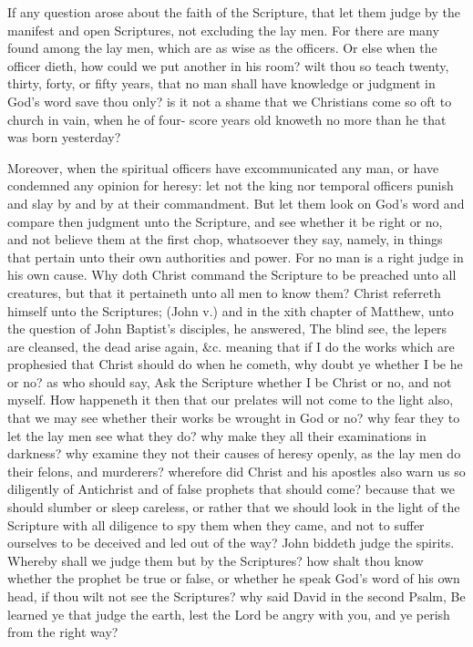 If any question arose about the faith of the Scripture, that 
let them judge by the manifest and open Scriptures, not 
excluding the lay men. For there are many found among 
the lay men, which are as wise as the officers. Or else 
when the officer dieth, how could we put another in his 
room? wilt thou so teach twenty, thirty, forty, or fifty 
years, that no man shall have knowledge or judgment in 
God's word save thou only? is it not a shame that we 
Christians come so oft to church in vain, when he of four- 
score years old knoweth no more than he that was born 
yesterday? 

Moreover, when the spiritual officers have excommunicated
any man, or have condemned any opinion for 
heresy: let not the king nor temporal officers punish and 
slay by and by at their commandment. But let them look 
on God's word and compare then judgment unto the Scripture,
and see whether it be right or no, and not believe 
them at the first chop, whatsoever they say, namely, in 
things that pertain unto their own authorities and power. 
For no man is a right judge in his own cause. Why doth 
Christ command the Scripture to be preached unto all 
creatures, but that it pertaineth unto all men to know 
them? Christ referreth himself unto the Scriptures; (John 
v.) and in the xith chapter of Matthew, unto the question 
of John Baptist's disciples, he answered, The blind see, the 
lepers are cleansed, the dead arise again, \&c. meaning that 
if I do the works which are prophesied that Christ should 
do when he cometh, why doubt ye whether I be he or no? 
as who should say, Ask the Scripture whether I be Christ or 
no, and not myself. How happeneth it then that our prelates
will not come to the light also, that we may see whether
their works be wrought in God or no? why fear they 
to let the lay men see what they do? why make they all their 
examinations in darkness? why examine they not their 
causes of heresy openly, as the lay men do their felons, and 
murderers? wherefore did Christ and his apostles also 
warn us so diligently of Antichrist and of false prophets 
that should come? because that we should slumber or 
sleep careless, or rather that we should look in the light of 
the Scripture with all diligence to spy them when they came, 
and not to suffer ourselves to be deceived and led out of the 
way? John biddeth judge the spirits. Whereby shall we 
judge them but by the Scriptures? how shalt thou know 
whether the prophet be true or false, or whether he speak 
God's word of his own head, if thou wilt not see the Scriptures?
why said David in the second Psalm, Be learned ye 
that judge the earth, lest the Lord be angry with you, and 
ye perish from the right way?

